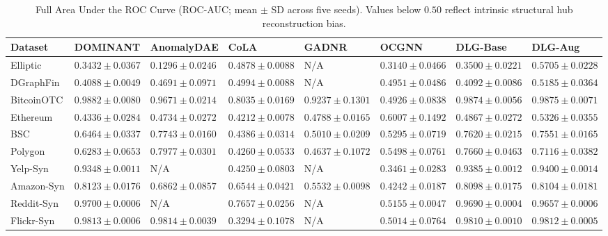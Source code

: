 \documentclass[11pt,a4paper]{article}
\begin{document}
\renewcommand{\thetable}{A\arabic{table}}
\setcounter{table}{0}

\begin{table}[H]
\centering\scriptsize\setlength{\tabcolsep}{1.5pt}
\caption{Full Area Under the ROC Curve (ROC-AUC; mean $\pm$ SD across five seeds). Values below $0.50$ reflect intrinsic structural hub reconstruction bias.}
\label{tab:app_roc_auc_full}
\begin{tabularx}{\textwidth}{lXXXXXXX}\toprule
\textbf{Dataset} & \textbf{DOMINANT} & \textbf{AnomalyDAE} & \textbf{CoLA} & \textbf{GADNR} & \textbf{OCGNN} & \textbf{DLG-Base} & \textbf{DLG-Aug} \\\midrule
Elliptic & $0.3432 \pm 0.0367$ & $0.1296 \pm 0.0246$ & $0.4878 \pm 0.0088$ & N/A & $0.3140 \pm 0.0466$ & $0.3500 \pm 0.0221$ & $\mathbf{0.5705 \pm 0.0228}$ \\
DGraphFin & $0.4088 \pm 0.0049$ & $0.4691 \pm 0.0971$ & $0.4994 \pm 0.0088$ & N/A & $0.4951 \pm 0.0486$ & $0.4092 \pm 0.0086$ & $\mathbf{0.5185 \pm 0.0364}$ \\
BitcoinOTC & $\mathbf{0.9882 \pm 0.0080}$ & $0.9671 \pm 0.0214$ & $0.8035 \pm 0.0169$ & $0.9237 \pm 0.1301$ & $0.4926 \pm 0.0838$ & $0.9874 \pm 0.0056$ & $0.9875 \pm 0.0071$ \\
Ethereum & $0.4336 \pm 0.0284$ & $0.4734 \pm 0.0272$ & $0.4212 \pm 0.0078$ & $0.4788 \pm 0.0165$ & $\mathbf{0.6007 \pm 0.1492}$ & $0.4867 \pm 0.0272$ & $0.5326 \pm 0.0355$ \\
BSC & $0.6464 \pm 0.0337$ & $\mathbf{0.7743 \pm 0.0160}$ & $0.4386 \pm 0.0314$ & $0.5010 \pm 0.0209$ & $0.5295 \pm 0.0719$ & $0.7620 \pm 0.0215$ & $0.7551 \pm 0.0165$ \\
Polygon & $0.6283 \pm 0.0653$ & $\mathbf{0.7977 \pm 0.0301}$ & $0.4260 \pm 0.0533$ & $0.4637 \pm 0.1072$ & $0.5498 \pm 0.0761$ & $0.7660 \pm 0.0463$ & $0.7116 \pm 0.0382$ \\
Yelp-Syn & $0.9348 \pm 0.0011$ & N/A & $0.4250 \pm 0.0803$ & N/A & $0.3461 \pm 0.0283$ & $0.9385 \pm 0.0012$ & $\mathbf{0.9400 \pm 0.0014}$ \\
Amazon-Syn & $\mathbf{0.8123 \pm 0.0176}$ & $0.6862 \pm 0.0857$ & $0.6544 \pm 0.0421$ & $0.5532 \pm 0.0098$ & $0.4242 \pm 0.0187$ & $0.8098 \pm 0.0175$ & $0.8104 \pm 0.0181$ \\
Reddit-Syn & $\mathbf{0.9700 \pm 0.0006}$ & N/A & $0.7657 \pm 0.0256$ & N/A & $0.5155 \pm 0.0047$ & $0.9690 \pm 0.0004$ & $0.9657 \pm 0.0006$ \\
Flickr-Syn & $0.9813 \pm 0.0006$ & $\mathbf{0.9814 \pm 0.0039}$ & $0.3294 \pm 0.1078$ & N/A & $0.5014 \pm 0.0764$ & $0.9810 \pm 0.0010$ & $0.9812 \pm 0.0005$ \\

\end{tabularx}
\end{table}
\end{document}
